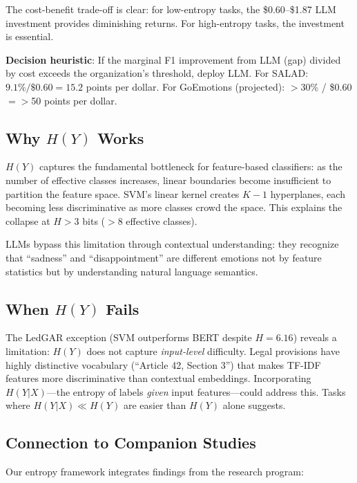 \documentclass[review,3p]{elsarticle}
\begin{document}
The cost-benefit trade-off is clear: for low-entropy tasks, the \$0.60--\$1.87 LLM investment provides diminishing returns. For high-entropy tasks, the investment is essential.

\textbf{Decision heuristic}: If the marginal F1 improvement from LLM (gap) divided by cost exceeds the organization's threshold, deploy LLM. For SALAD: $9.1\% / \$0.60 = 15.2$ points per dollar. For GoEmotions (projected): $>$30\% / \$0.60 $= >$50 points per dollar.

\subsection{Why $H(Y)$ Works}
$H(Y)$ captures the fundamental bottleneck for feature-based classifiers: as the number of effective classes increases, linear boundaries become insufficient to partition the feature space. SVM's linear kernel creates $K-1$ hyperplanes, each becoming less discriminative as more classes crowd the space. This explains the collapse at $H > 3$ bits ($>$8 effective classes).

LLMs bypass this limitation through contextual understanding: they recognize that ``sadness'' and ``disappointment'' are different emotions not by feature statistics but by understanding natural language semantics.

\subsection{When $H(Y)$ Fails}
The LedGAR exception (SVM outperforms BERT despite $H=6.16$) reveals a limitation: $H(Y)$ does not capture \emph{input-level} difficulty. Legal provisions have highly distinctive vocabulary (``Article 42, Section 3'') that makes TF-IDF features more discriminative than contextual embeddings. Incorporating $H(Y|X)$---the entropy of labels \emph{given} input features---could address this. Tasks where $H(Y|X) \ll H(Y)$ are easier than $H(Y)$ alone suggests.

\subsection{Connection to Companion Studies}
Our entropy framework integrates findings from the research program:
\end{document}
